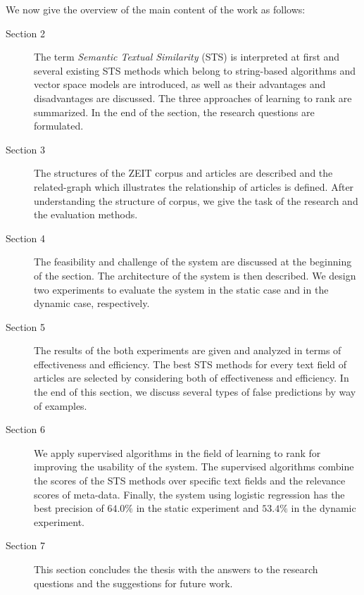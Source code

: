 We now give the overview of the main content of the work as follows:
\begin{description}
    \item[Section 2] The term \textit{Semantic Textual Similarity} (STS) is interpreted at first and several existing STS methods which belong to string-based algorithms and vector space models are introduced, as well as their advantages and disadvantages are discussed. The three approaches of learning to rank are summarized. In the end of the section, the research questions are formulated.
    \item[Section 3] The structures of the ZEIT corpus and articles are described and the related-graph which illustrates the relationship of articles is defined. After understanding the structure of corpus, we give the task of the research and the evaluation methods. 
    \item[Section 4] The feasibility and challenge of the system are discussed at the beginning of the section. The architecture of the system is then described. We design two experiments to evaluate the system in the static case and in the dynamic case, respectively. 
    \item[Section 5] The results of the both experiments are given and analyzed in terms of effectiveness and efficiency. The best STS methods for every text field of articles are selected by considering both of effectiveness and efficiency. In the end of this section, we discuss several types of false predictions by way of examples.
    \item[Section 6] We apply supervised algorithms in the field of learning to rank for improving the usability of the system. The supervised algorithms combine the scores of the STS methods over specific text fields and the relevance scores of meta-data. Finally, the system using logistic regression has the best precision of $64.0\%$ in the static experiment and $53.4\%$ in the dynamic experiment.
    \item[Section 7] This section concludes the thesis with the answers to the research questions and the suggestions for future work.
\end{description}